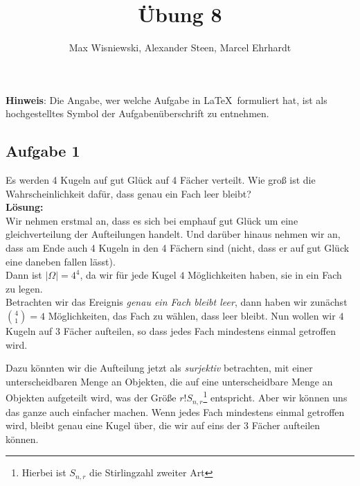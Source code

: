 \documentclass[11pt,a4paper,ngerman]{article}
\date{}
\title{Übung 8}
\author{Max Wisniewski\maxw, Alexander Steen\alex, Marcel Ehrhardt\marcel}
\begin{document}

\renewcommand{\figurename}{Figure}

\maketitle
\thispagestyle{fancy}

\begin{center}
\textbf{Hinweis}: Die Angabe, wer welche Aufgabe in \LaTeX\ formuliert hat, ist als hochgestelltes Symbol der Aufgabenüberschrift zu entnehmen.
\end{center}


\subsection*{Aufgabe 1}

Es werden 4 Kugeln auf gut Glück auf 4 Fächer verteilt. Wie groß ist die Wahrscheinlichkeit dafür, dass genau ein Fach leer bleibt?\\

\textbf{Lösung:}\\
Wir nehmen erstmal an, dass es sich bei emph{auf gut Glück} um eine gleichverteilung der Aufteilungen handelt. Und darüber hinaus nehmen
wir an, dass am Ende auch 4 Kugeln in den 4 Fächern sind (nicht, dass er auf gut Glück eine daneben fallen lässt).\\

Dann ist $\left| \Omega \right| = 4^4$, da wir für jede Kugel $4$ Möglichkeiten haben, sie in ein Fach zu legen.\\

Betrachten wir das Ereignis \emph{genau ein Fach bleibt leer}, dann haben wir zunächst $\binom{4}{1} = 4$ Möglichkeiten, das Fach zu wählen,
dass leer bleibt. Nun wollen wir $4$ Kugeln auf $3$ Fächer aufteilen, so dass jedes Fach mindestens einmal getroffen wird.

Dazu könnten wir die Aufteilung jetzt als \emph{surjektiv} betrachten, mit einer unterscheidbaren Menge an Objekten, die auf eine unterscheidbare
Menge an Objekten aufgeteilt wird, was der Größe $r!S_{n,r}$\footnote{Hierbei ist $S_{n,r}$ die Stirlingzahl zweiter Art} entspricht. Aber wir können uns
das ganze auch einfacher machen. Wenn jedes Fach mindestens einmal getroffen wird, bleibt genau eine Kugel über, die wir auf eins der 3 Fächer aufteilen können.
\end{document}
